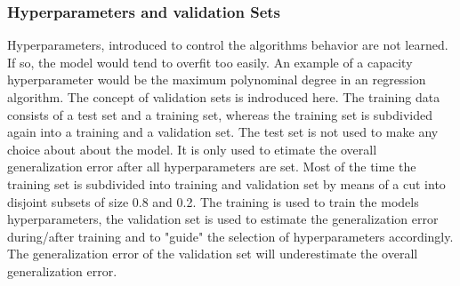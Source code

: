 \documentclass[12pt, a4paper]{article}
\begin{document}
	\subsubsection{Hyperparameters and validation Sets}
	Hyperparameters, introduced to control the algorithms behavior are not learned. If so, the model would tend to overfit too easily. An example of a capacity hyperparameter would be the maximum polynominal degree in an regression algorithm. The concept of validation sets is indroduced here. The training data consists of a test set and a training set, whereas the training set is subdivided again into a training and a validation set. The test set is not used to make any choice about about the model. It is only used to etimate the overall generalization error after all hyperparameters are set. Most of the time the training set is subdivided into training and validation set by means of a cut into disjoint subsets of size 0.8 and 0.2. The training is used to train the models hyperparameters, the validation set is used to estimate the generalization error during/after training and to "guide" the selection of hyperparameters accordingly. The generalization error of the validation set will underestimate the overall generalization error.
\end{document}

